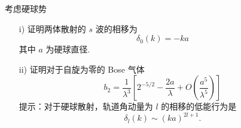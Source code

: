 \documentclass{assignment}
\begin{document}
\begin{prob}
    考虑硬球势
    \begin{itemize}
        \item[i)] 证明两体散射的 $s$ 波的相移为
        \[
            \delta_0(k)=-ka
        \]
        其中 $a$ 为硬球直径.
        \item[ii)] 证明对于自旋为零的 Bose 气体
        \[
            b_2=\frac{1}{\lambda^3}\left[2^{-5/2}-\frac{2a}{\lambda}+O\left(\frac{a^5}{\lambda^5}\right)\right]
        \]
        提示：对于硬球散射，轨道角动量为 $l$ 的相移的低能行为是
        \[
            \delta_l(k)\sim(ka)^{2l+1}.
        \]
    \end{itemize}
\end{prob}
\begin{sol}
    
\end{sol}
\end{document}
